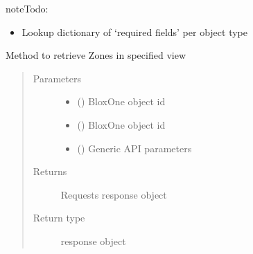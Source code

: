 \documentclass[letterpaper,10pt,english]{sphinxmanual}
\begin{document}
\begin{fulllineitems}
\begin{fulllineitems}
\begin{sphinxadmonition}{note}{\label{\detokenize{b1ddi-class:id1}}Todo:}
\begin{itemize}
\item {} 
\sphinxAtStartPar
Lookup dictionary of ‘required fields’ per object type

\end{itemize}
\end{sphinxadmonition}

\end{fulllineitems}


\begin{fulllineitems}
\label{\detokenize{b1ddi-class:bloxone.b1ddi.get_zone_child}}
\sphinxAtStartPar
Method to retrieve Zones in specified view
\begin{quote}\begin{description}
\item[{Parameters}] \leavevmode\begin{itemize}
\item {} 
\sphinxAtStartPar
{} () \textendash{} BloxOne object id

\item {} 
\sphinxAtStartPar
{} () \textendash{} BloxOne object id

\item {} 
\sphinxAtStartPar
{} () \textendash{} Generic API parameters

\end{itemize}

\item[{Returns}] \leavevmode
\sphinxAtStartPar
Requests response object

\item[{Return type}] \leavevmode
\sphinxAtStartPar
response object


\end{description}
\end{quote}
\end{fulllineitems}
\end{fulllineitems}
\end{document}
